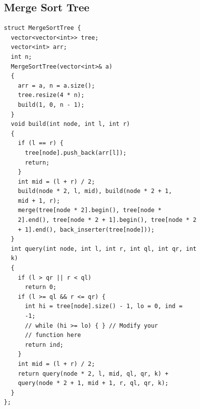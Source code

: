 \subsection{Merge Sort Tree}
\begin{verbatim}
struct MergeSortTree {
  vector<vector<int>> tree;
  vector<int> arr;
  int n;
  MergeSortTree(vector<int>& a)
  {
    arr = a, n = a.size();
    tree.resize(4 * n);
    build(1, 0, n - 1);
  }
  void build(int node, int l, int r)
  {
    if (l == r) {
      tree[node].push_back(arr[l]);
      return;
    }
    int mid = (l + r) / 2;
    build(node * 2, l, mid), build(node * 2 + 1,
    mid + 1, r);
    merge(tree[node * 2].begin(), tree[node *
    2].end(), tree[node * 2 + 1].begin(), tree[node * 2
    + 1].end(), back_inserter(tree[node]));
  }
  int query(int node, int l, int r, int ql, int qr, int
  k)
  {
    if (l > qr || r < ql)
      return 0;
    if (l >= ql && r <= qr) {
      int hi = tree[node].size() - 1, lo = 0, ind =
      -1;
      // while (hi >= lo) { } // Modify your
      // function here
      return ind;
    }
    int mid = (l + r) / 2;
    return query(node * 2, l, mid, ql, qr, k) +
    query(node * 2 + 1, mid + 1, r, ql, qr, k);
  }
};
\end{verbatim}

